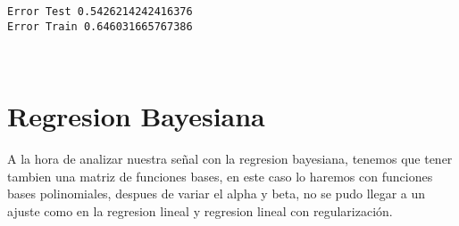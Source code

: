 \documentclass[11pt]{article}
\begin{document}
    \begin{Verbatim}[commandchars=\\\{\}]
Error Test 0.5426214242416376
Error Train 0.646031665767386

    \end{Verbatim}

    \begin{center}
    \end{center}
    { \hspace*{\fill} \\}
    
    \section{Regresion Bayesiana}\label{regresion-bayesiana}

A la hora de analizar nuestra señal con la regresion bayesiana, tenemos
que tener tambien una matriz de funciones bases, en este caso lo haremos
con funciones bases polinomiales, despues de variar el alpha y beta, no
se pudo llegar a un ajuste como en la regresion lineal y regresion
lineal con regularización.
\end{document}
